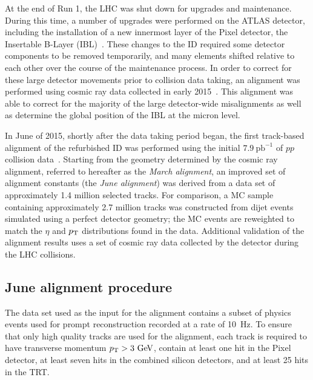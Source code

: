 At the end of Run 1, the LHC was shut down for upgrades and maintenance.
During this time, a number of upgrades were performed on the ATLAS detector, including the installation of a new innermost layer of the Pixel detector, the Insertable B-Layer (IBL)~\cite{2010.ibl-tdr}. 
These changes to the ID required some detector components to be removed temporarily, and many elements shifted relative to each other over the course of the maintenance process.
In order to correct for these large detector movements prior to  collision data taking, an alignment was performed using cosmic ray data collected in early 2015~\cite{2015.alignment-2015-cosmic}.
This alignment was able to correct for the majority of the large detector-wide misalignments as well as determine the global position of the IBL at the micron level.

In June of 2015, shortly after the data taking period began, the first track-based alignment of the refurbished ID was performed using the initial $7.9~\mathrm{pb}^{-1}$ of  $pp$ collision data~\cite{2015.alignment-13tev}.
Starting from the geometry determined by the cosmic ray alignment, referred to hereafter as the \emph{March alignment}, an improved set of alignment constants (the \emph{June alignment}) was derived from a data set of approximately 1.4 million selected tracks.
For comparison, a MC sample containing approximately 2.7 million tracks was constructed from dijet events simulated using a perfect detector geometry; the MC events are reweighted to match the $\eta$ and $p_{\mathrm{T}}$ distributions found in the data.
Additional validation of the alignment results uses a set of cosmic ray data collected by the detector during the LHC collisions.

\subsection{June alignment procedure}
The data set used as the input for the alignment contains a subset of physics events used for prompt reconstruction recorded at a rate of 10~Hz.
To ensure that only high quality tracks are used for the alignment, each track is required to have transverse momentum $\pt > 3\gev$, contain at least one hit in the Pixel detector, at least seven hits in the combined silicon detectors, and at least 25 hits in the TRT.

